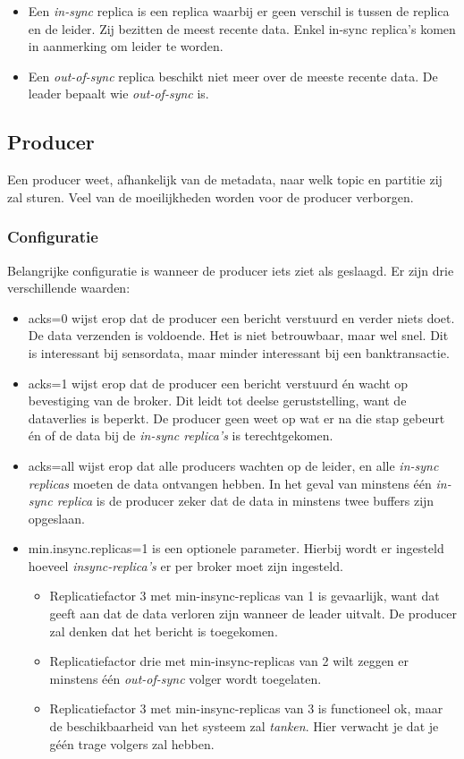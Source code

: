 \documentclass[a4paper,10pt,twoside]{report}
\begin{document}
\begin{itemize}
	\item Een \textit{in-sync} replica is een replica waarbij er geen verschil is tussen de replica en de leider. Zij bezitten de meest recente data. Enkel in-sync replica's komen in aanmerking om leider te worden.
	\item Een \textit{out-of-sync} replica beschikt niet meer over de meeste recente data. De leader bepaalt wie \textit{out-of-sync} is.
\end{itemize}

\subsection{Producer}
Een producer weet, afhankelijk van de metadata, naar welk topic en partitie zij zal sturen. Veel van de moeilijkheden worden voor de producer verborgen. 

\subsubsection{Configuratie}
Belangrijke configuratie is wanneer de producer iets ziet als geslaagd. Er zijn drie verschillende waarden:

\begin{itemize}
	\item acks=0 wijst erop dat de producer een bericht verstuurd en verder niets doet. De data verzenden is voldoende. Het is niet betrouwbaar, maar wel snel. Dit is interessant bij sensordata, maar minder interessant bij een banktransactie.
	\item acks=1 wijst erop dat de producer een bericht verstuurd én wacht op bevestiging van de broker. Dit leidt tot deelse geruststelling, want de dataverlies is beperkt. De producer geen weet op wat er na die stap gebeurt én of de data bij de \textit{in-sync replica's} is terechtgekomen.
	\item acks=all wijst erop dat alle producers wachten op de leider, en alle \textit{in-sync replicas} moeten de data ontvangen hebben. In het geval van minstens één \textit{in-sync replica} is de producer zeker dat de data in minstens twee buffers zijn opgeslaan. 
	\item min.insync.replicas=1 is een optionele parameter. Hierbij wordt er ingesteld hoeveel \textit{insync-replica's} er per broker moet zijn ingesteld.
	\begin{itemize}
		\item Replicatiefactor 3 met min-insync-replicas van 1 is gevaarlijk, want dat geeft aan dat de data verloren zijn wanneer de leader uitvalt. De producer zal denken dat het bericht is toegekomen.
		\item Replicatiefactor drie met min-insync-replicas van 2 wilt zeggen er minstens één \textit{out-of-sync} volger wordt toegelaten.
		\item Replicatiefactor 3 met min-insync-replicas van 3 is functioneel ok, maar de beschikbaarheid van het systeem zal \textit{tanken}. Hier verwacht je dat je géén trage volgers zal hebben.
	\end{itemize}
\end{itemize}
\end{document}
